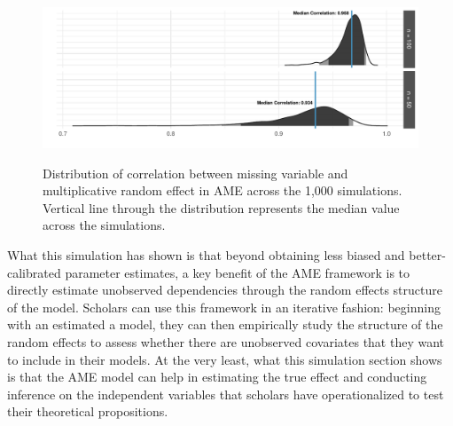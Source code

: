 \begin{figure}
	\centering
	\caption{Distribution of correlation between missing variable and multiplicative random effect in AME across the 1,000 simulations. Vertical line through the distribution represents the median value across the simulations.}
	\label{fig:ameCorr}
	\includegraphics[width=1\textwidth]{ameSimCorr.pdf} \\
\end{figure}

What this simulation has shown is that beyond obtaining less biased and better-calibrated parameter estimates, a key benefit of the AME framework is to directly estimate unobserved dependencies through the random effects structure of the model. Scholars can use this framework in an iterative fashion: beginning with an estimated a model, they can then empirically study the structure of the random effects to assess whether there are unobserved covariates that they want to include in their models. At the very least, what this simulation section shows is that the AME model can help in estimating the true effect and conducting inference on the independent variables that scholars have operationalized to test their theoretical propositions.
